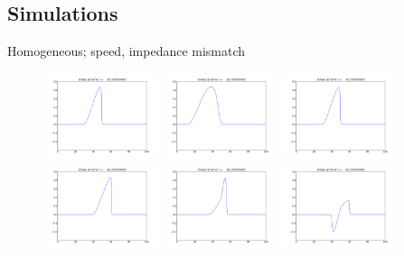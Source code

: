\documentclass{beamer}
\begin{document}
\subsection{Simulations}
\begin{frame}{Homogeneous; speed, impedance mismatch}
\begin{figure}
  \includegraphics[width=0.3\textwidth]{homo1.png}
  \includegraphics[width=0.3\textwidth]{sound1.png}
  \includegraphics[width=0.3\textwidth]{reflect1.png}\\
  \includegraphics[width=0.3\textwidth]{homo3.png}
  \includegraphics[width=0.3\textwidth]{sound3.png}
  \includegraphics[width=0.3\textwidth]{reflect3.png}\\

\end{figure}
\end{frame}
\end{document}

